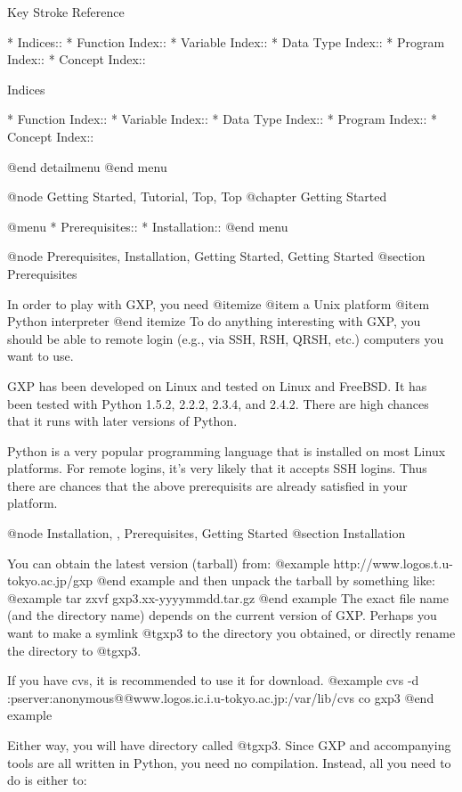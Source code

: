 Key Stroke Reference

* Indices::                     
* Function Index::              
* Variable Index::              
* Data Type Index::             
* Program Index::               
* Concept Index::               

Indices

* Function Index::              
* Variable Index::              
* Data Type Index::             
* Program Index::               
* Concept Index::               

@end detailmenu
@end menu

@node Getting Started, Tutorial, Top, Top
@chapter Getting Started


@menu
* Prerequisites::               
* Installation::                
@end menu

@node Prerequisites, Installation, Getting Started, Getting Started
@section Prerequisites

In order to play with GXP, you need
@itemize
@item a Unix platform
@item Python interpreter
@end itemize
To do anything interesting with GXP, you should be able to remote
login (e.g., via SSH, RSH, QRSH, etc.) computers you want to use.

GXP has been developed on Linux and tested on Linux and FreeBSD.  It
has been tested with Python 1.5.2, 2.2.2, 2.3.4, and 2.4.2.  There are
high chances that it runs with later versions of Python.

Python is a very popular programming language that is installed on
most Linux platforms. For remote logins, it's very likely that it
accepts SSH logins. Thus there are chances that the above prerequisits
are already satisfied in your platform.

@node Installation,  , Prerequisites, Getting Started
@section Installation

You can obtain the latest version (tarball) from:
@example
    http://www.logos.t.u-tokyo.ac.jp/gxp
@end example
and then unpack the tarball by something like:
@example
    tar zxvf gxp3.xx-yyyymmdd.tar.gz 
@end example
The exact file name (and the directory name) depends on the current
version of GXP. Perhaps you want to make a symlink @t{gxp3} to the
directory you obtained, or directly rename the directory to @t{gxp3}.

If you have cvs, it is recommended to use it for download.
@example
cvs -d :pserver:anonymous@@www.logos.ic.i.u-tokyo.ac.jp:/var/lib/cvs co gxp3
@end example

Either way, you will have directory called @t{gxp3}. Since GXP and
accompanying tools are all written in Python, you need no compilation.
Instead, all you need to do is either to:

